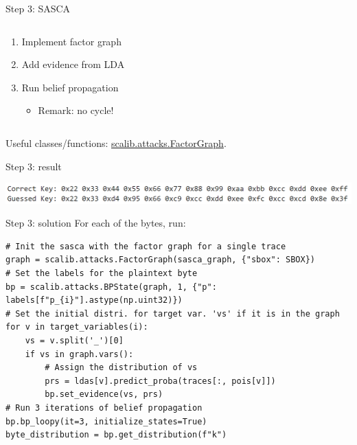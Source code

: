 \documentclass[aspectratio=169]{beamer}
\begin{document}
\begin{frame}{Step 3: SASCA}
    \begin{columns}
        \begin{column}{0.4\textwidth}
            \begin{enumerate}
                \item Implement factor graph
                \item Add evidence from LDA
                \item Run belief propagation
                    \begin{itemize}
                        \item Remark: no cycle!
                    \end{itemize}
            \end{enumerate}
        \end{column}
        \begin{column}{0.5\textwidth}
            \resizebox{\textwidth}{!}{
                \begin{tikzpicture}
                    
                \end{tikzpicture}
            }
        \end{column}
    \end{columns}

    Useful classes/functions:
    \href{https://scalib.readthedocs.io/en/stable/source/api/scalib.attacks.FactorGraph.html}{scalib.attacks.FactorGraph}.
\end{frame}
\begin{frame}{Step 3: result}
    \begin{center}
        \includegraphics[width=\textwidth]{figures/res_step3.png}
    \end{center}
\end{frame}
\begin{frame}[containsverbatim]{Step 3: solution}
    \small
For each of the bytes, run:
\begin{verbatim}
# Init the sasca with the factor graph for a single trace
graph = scalib.attacks.FactorGraph(sasca_graph, {"sbox": SBOX})
# Set the labels for the plaintext byte
bp = scalib.attacks.BPState(graph, 1, {"p": labels[f"p_{i}"].astype(np.uint32)})
# Set the initial distri. for target var. 'vs' if it is in the graph
for v in target_variables(i):
    vs = v.split('_')[0]
    if vs in graph.vars():
        # Assign the distribution of vs
        prs = ldas[v].predict_proba(traces[:, pois[v]])
        bp.set_evidence(vs, prs)
# Run 3 iterations of belief propagation
bp.bp_loopy(it=3, initialize_states=True)
byte_distribution = bp.get_distribution(f"k")
\end{verbatim}
\end{frame}
\end{document}
